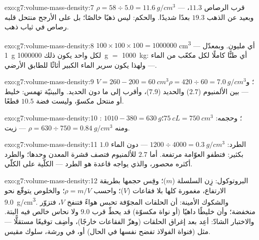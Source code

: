 \begin{solution}{exo:g7:volume-mass-density:7}
$\rho = 58 \div 5.0 = \qty{11.6}{g/cm^3}$ --- قرب 
الرصاص $11.3$، وبعيد عن  الذهب $19.3$ بعدًا شديدًا.
والحكم: ليس ذهبًا خالصًا؛ بل على الأرجح منتحل قلبه رصاص في
ثياب ذهب.
\end{solution}

\begin{solution}{exo:g7:volume-mass-density:8}
$100 \times 100 \times 100 = 1000000$ \unit{cm^3} --- أي
مليون. وبمعدّل \qty{1}{g} لكل واحد يكون ذلك \qty{1000000}{g}
$=$ \qty{1000}{kg}: أي طنًّا كاملًا لكل  مكعّب من الماء ---
ولهذا يكون سرير الماء الكبير أثاثًا للطابق الأرضي.
\end{solution}

\begin{solution}{exo:g7:volume-mass-density:9}
$V = 260 - 200 = \qty{60}{cm^3}$؛
و$\rho = 420 \div 60 = \qty{7.0}{g/cm^3}$ --- بين الألمنيوم
($2.7$) والحديد ($7.9$)، وأقرب إلى ما دون الحديد. والبينيّة
تهمس: خليط أو منتحل مكسوّ، وليست فضة $10.5$ قطعًا.
\end{solution}

\begin{solution}{exo:g7:volume-mass-density:10}
 : $1010 - 380 = \qty{630}{g}$؛ وحجمه:
$\qty{75}{cL} = \qty{750}{cm^3}$؛ ومنه $\rho = 630 \div 750 =
\qty{0.84}{g/cm^3}$ --- زيت.
\end{solution}

\begin{solution}{exo:g7:volume-mass-density:11}
 الطرد: $1200 \div 4000 = \qty{0.3}{g/cm^3}$ --- دون
 الماء $1.0$ بكثير: فتطفو العوّامة مرتفعة. أما $2.7$
للألمنيوم فتصف قشرة المعدن وحدها؛ والطرد أكثره  محصور،
والذي يواجه قاعدة  هو الطرد ---  الكلّية على 
الكلّي.
\end{solution}

\begin{solution}{exo:g7:volume-mass-density:12}
البروتوكول: زِن السلسلة ($m$)؛ وقِس حجمها بطريقة الارتفاع،
مغمورة كلها بلا فقاعات ($V$)؛ واحسب $\rho = m/V$؛ والخلوص
يتوقّع نحو \qty{9.0}{g/cm^3}. والشكوك الأمينة: أن الحلقات
المجوّفة تحبس هواءً فتنفخ $V$، فتزوّر  منخفضة؛ وأن خليطًا
داهيًا (أو نواة مكسوّة) قد يحطّ قرب $9.0$ ولا نحاس خالص فيه
البتة. والاختبار الشادّ: أعِد   بعد إغراق الحلقات
(وهزّ الفقاعات خارجًا)، وأضِف توقيعًا مستقلًّا --- مثل
 (فنواة الفولاذ تفضح نفسها في الحال) أو، في ورشة،
سلوك  مقيس.
\end{solution}

